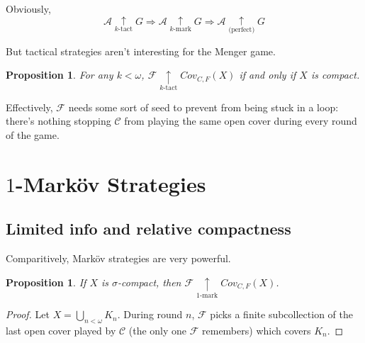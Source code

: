 \documentclass{beamer}
\newtheorem{proposition}[theorem]{Proposition}
\theoremstyle{definition}
\newcommand{\kmarkwin}[1]{\underset{#1\text{-mark}}{\uparrow}}
\newcommand{\ktactwin}[1]{\underset{#1\text{-tact}}{\uparrow}}
\newcommand{\mengame}[1]{Cov_{C,F}(#1)}
\newcommand{\<}{\langle}
\renewcommand{\>}{\rangle}
\newcommand{\pl}[1]{\mathscr{#1}}
\begin{document}
\begin{frame}
  Obviously,
  \[
    \pl A \ktactwin{k} G
      \Rightarrow
    \pl A \kmarkwin{k} G
      \Rightarrow
    \pl A \underset{\text{(perfect)}}{\uparrow} G
  \]

  \vpause

  But tactical strategies aren't interesting for the Menger game.

  \begin{proposition}
    For any $k<\omega$,
    $\pl F\ktactwin{k}\mengame X$ if and only if $X$ is compact.
  \end{proposition}

  Effectively, $\pl F$ needs some sort of seed to prevent from being
  stuck in a loop: there's nothing stopping $\pl C$ from playing the
  same open cover during every round of the game.
\end{frame}

\section{$1$-Mark\"ov Strategies}

\subsection{Limited info and relative compactness}

\begin{frame}
  Comparitively, Mark\"ov strategies are very powerful.

  \begin{proposition}
    If $X$ is $\sigma$-compact, then $\pl F \kmarkwin{1}\mengame X$.
  \end{proposition}

  \begin{proof}
    Let $X=\bigcup_{n<\omega}K_n$. During round $n$, $\pl F$ picks a finite
    subcollection of
    the last open cover played by $\pl C$ (the only one $\pl F$ remembers)
    which covers $K_n$.
  \end{proof}
\end{frame}
\end{document}
